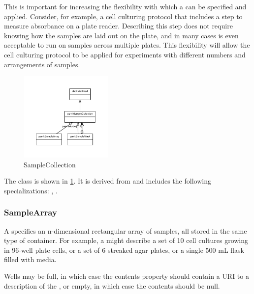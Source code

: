         This is important for increasing the flexibility with which a  can be specified and applied.
         Consider, for example, a cell culturing protocol that includes a step to measure  absorbance on a plate
         reader. Describing this step does not require knowing how the samples are laid out on the plate, and in many
         cases is even acceptable to run on samples across multiple plates. This flexibility will allow the cell
         culturing protocol to be applied for experiments with different numbers and arrangements of samples.%
\newline%
\linebreak%


\begin{figure}[h!]%
\centering%
\includegraphics[width=0.40212765957446805\textwidth]{labop_classes/SampleCollection_abstraction_hierarchy.pdf}%
\caption{SampleCollection}%
\label{fig:SampleCollection}%
\end{figure}

%
The  class is shown in \ref{fig:SampleCollection}. It is derived from  and includes the following specializations: , . %
%
\subsubsection{SampleArray}%
\label{sec:labop:SampleArray}%
A  specifies an n-dimensional rectangular array of samples, all stored in the same
        type of container. For example, a  might describe a set of 10 cell cultures growing in
        96-well plate cells, or a set of 6 streaked agar plates, or a single 500 mL flask filled with media.

        Wells may be full, in which case the contents property should contain a URI to a description of the ,
        or empty, in which case the contents should be null.

